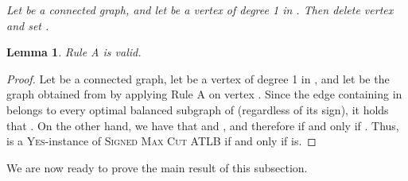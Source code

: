 \documentclass[
final
]{dmtcs-episciences}
\newtheorem{lemma}{Lemma}{\bfseries}{\itshape}
\begin{document}
 {\it{Let  be a connected graph, and let  be a vertex of degree 1 in . Then delete vertex  and set  .}}





\begin{lemma}\label{lem:RuleA}
Rule A is valid.
\end{lemma}
\begin{proof} Let  be a connected graph, let  be a vertex of degree 1 in , and let  be the graph obtained from  by applying Rule A on vertex . Since the edge containing  in belongs to every optimal balanced subgraph of  (regardless of its sign), it holds that . On the other hand, we have that  and , and therefore  if and only if . Thus,  is a \textsc{Yes}-instance of \textsc{Signed Max Cut ATLB} if and only if  is.
\end{proof}

We are now ready to prove the main result of this subsection.
\end{document}
